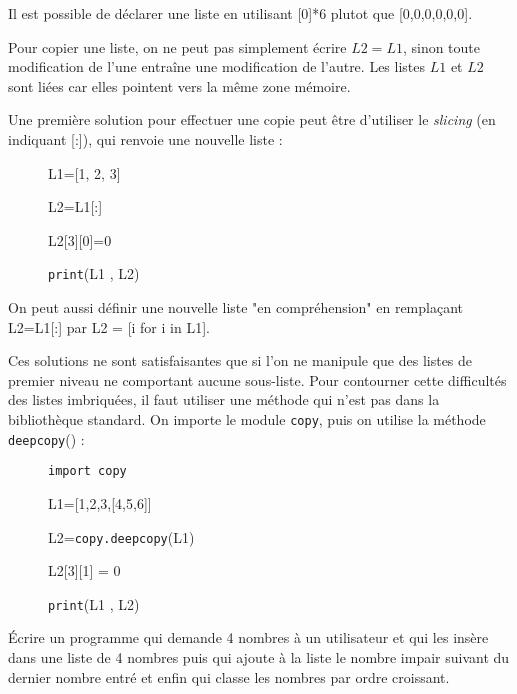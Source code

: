 \begin{Rq}
Il est possible de déclarer une liste en utilisant [0]*6 plutot que [0,0,0,0,0,0].
\end{Rq}



Pour copier une liste, on ne peut pas simplement écrire $L2=L1$, sinon toute modification de l’une
entraîne une modification de l’autre. Les listes $L1$ et $L2$ sont liées car elles pointent vers la même zone mémoire.
 

Une première solution pour effectuer une copie peut être d'utiliser le \textit{slicing} (en indiquant [:]), qui renvoie une nouvelle liste :

\begin{Cod}
\begin{description}
\item[] L1=[1, 2, 3]
\item[] L2=L1[:] 
\item[] L2[3][0]=0
\item[] \texttt{print}(L1 , L2)
\end{description}
\end{Cod}

\begin{Rq} 
On peut aussi définir une nouvelle liste "en compréhension" en remplaçant L2=L1[:] par L2 = [i for i in L1].
\end{Rq}

Ces solutions ne sont satisfaisantes que si l’on ne manipule que des listes de premier niveau ne comportant aucune
sous-liste. Pour contourner cette difficultés des listes imbriquées, il faut utiliser une méthode qui n’est pas dans la bibliothèque standard. On importe le module \texttt{copy}, puis on utilise la méthode \texttt{deepcopy}() :


\begin{Cod}
\begin{description}
\item[] \texttt{import copy}
\item[] L1=[1,2,3,[4,5,6]] 
\item[] L2=\texttt{copy.deepcopy}(L1)
\item[] L2[3][1] = 0
\item[] \texttt{print}(L1 , L2)
\end{description}
\end{Cod}



\begin{ExD} 

Écrire un programme qui demande 4 nombres à un utilisateur et qui les insère dans une liste de 4 nombres puis qui ajoute à la liste le nombre impair suivant du dernier nombre entré et enfin qui classe les nombres par ordre croissant.
\end{ExD}

